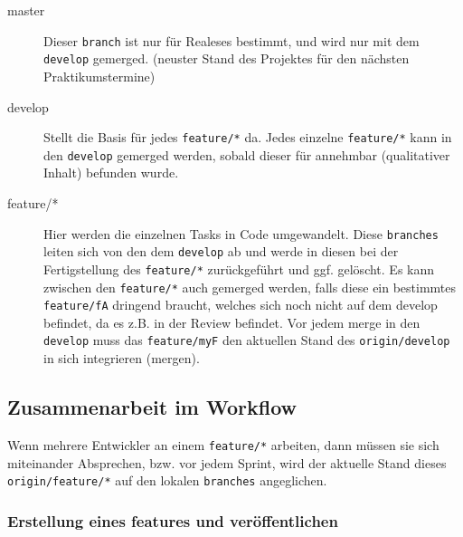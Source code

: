 \documentclass[
   draft=false
  ,paper=a4
  ,twoside=false
  ,fontsize=11pt
  ,headsepline
  ,DIV=11
  ,parskip=full+
  ,titlepage
]{scrartcl} %
\begin{document}
  
  \begin{description}
    \item[master] Dieser \texttt{branch} ist nur für Realeses bestimmt, 
    und wird nur mit dem \texttt{develop} gemerged. 
    (neuster Stand des Projektes für den nächsten Praktikumstermine)
    \item[develop] Stellt die Basis für jedes \texttt{feature/*} da. Jedes
    einzelne \texttt{feature/*} kann in den \texttt{develop} gemerged werden,
    sobald dieser für annehmbar (qualitativer Inhalt) befunden wurde.     
    \item[feature/*] Hier werden die einzelnen Tasks in Code umgewandelt.
    Diese \texttt{branches} leiten sich von den
    dem \texttt{develop} ab und werde in diesen bei der Fertigstellung des
    \texttt{feature/*} zurückgeführt und ggf. gelöscht. Es kann zwischen
    den \texttt{feature/*} auch gemerged werden, falls diese 
    ein bestimmtes \texttt{feature/fA} dringend braucht, welches sich 
    noch nicht auf dem develop befindet, da es z.B. in der Review befindet.
    Vor jedem merge in den \texttt{develop} muss das \texttt{feature/myF}
    den aktuellen Stand des \texttt{origin/develop} in sich integrieren
    (mergen). 
  \end{description}
  
  
  \subsection{Zusammenarbeit im Workflow}
    Wenn mehrere Entwickler an einem \texttt{feature/*} arbeiten, dann
    müssen sie sich miteinander Absprechen, bzw. vor jedem Sprint, wird 
    der aktuelle Stand dieses \texttt{origin/feature/*} auf den lokalen
    \texttt{branches} angeglichen. 
    
  \subsubsection{Erstellung eines features und veröffentlichen}
    
\end{document}
